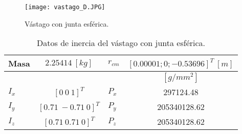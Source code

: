 \begin{figure}[htb!]
    \centering
    \texttt{[image: vastago\_D.JPG]}
    \caption{Vástago con junta esférica.}
    \label{fig:my_label}
\end{figure}

\begin{table}[hb!]
 \begin{center}
\begin{tabular}{lclc}


% 

 Masa & $ 2.25414\ [kg]$ & $r_{cm}$ & $[0.00001; 0; -0.53696]^T \ [m]$  \\
 \hline
 & & & $[g/mm^2]$\\
 \hline
 $ I_x $ & $ [0 \ 0 \ 1]^T $ & $ P_x $ & 297124.48\\
 $ I_y $ & $ [0.71 \ -0.71 \ 0]^T $ & $ P_y $ & 205340128.62\\
 $ I_z $ & $ [0.71 \ 0.71 \ 0]^T $ & $ P_z $ & 205340128.62
\end{tabular}
\end{center}
\caption{Datos de inercia del vástago con junta esférica.}
\label{tab: inertia table joint}
\end{table}
